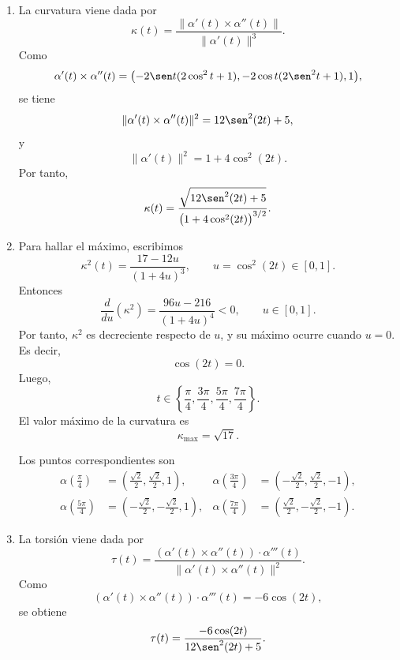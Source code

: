 \documentclass[11pt,respuestas,a4]{aleph-examen}
\begin{document}
\begin{preguntas}
\begin{respuesta}
\begin{enumerate}
    \item La curvatura viene dada por
    \[
        \kappa(t)
        =
        \frac{\|\alpha'(t)\times\alpha''(t)\|}{\|\alpha'(t)\|^3}.
    \]
    Como
    \[
        \alpha'(t)\times\alpha''(t)
        =
        \bigl(
            -2\sen t(2\cos^2t+1),
            -2\cos t(2\sen^2t+1),
            1
        \bigr),
    \]
    se tiene
    \[
        \|\alpha'(t)\times\alpha''(t)\|^2
        =
        12\sen^2(2t)+5,
    \]
    y
    \[
        \|\alpha'(t)\|^2
        =
        1+4\cos^2(2t).
    \]
    Por tanto,
    \[
        \kappa(t)
        =
        \frac{\sqrt{12\sen^2(2t)+5}}
        {\bigl(1+4\cos^2(2t)\bigr)^{3/2}}.
    \]

    \item Para hallar el máximo, escribimos
    \[
        \kappa^2(t)
        =
        \frac{17-12u}{(1+4u)^3},
        \qquad
        u=\cos^2(2t)\in[0,1].
    \]
    Entonces
    \[
        \frac{d}{du}\left(\kappa^2\right)
        =
        \frac{96u-216}{(1+4u)^4}<0,
        \qquad u\in[0,1].
    \]
    Por tanto, \(\kappa^2\) es decreciente respecto de \(u\), y su máximo ocurre cuando \(u=0\). Es decir,
    \[
        \cos(2t)=0.
    \]
    Luego,
    \[
        t\in
        \left\{
            \frac{\pi}{4},
            \frac{3\pi}{4},
            \frac{5\pi}{4},
            \frac{7\pi}{4}
        \right\}.
    \]
    El valor máximo de la curvatura es
    \[
        \kappa_{\max}=\sqrt{17}.
    \]

    Los puntos correspondientes son
    \begin{align*}
        \alpha\left(\frac{\pi}{4}\right)
        &=
        \left(
            \frac{\sqrt{2}}{2},
            \frac{\sqrt{2}}{2},
            1
        \right),
        &
        \alpha\left(\frac{3\pi}{4}\right)
        &=
        \left(
            -\frac{\sqrt{2}}{2},
            \frac{\sqrt{2}}{2},
            -1
        \right),
        \\
        \alpha\left(\frac{5\pi}{4}\right)
        &=
        \left(
            -\frac{\sqrt{2}}{2},
            -\frac{\sqrt{2}}{2},
            1
        \right),
        &
        \alpha\left(\frac{7\pi}{4}\right)
        &=
        \left(
            \frac{\sqrt{2}}{2},
            -\frac{\sqrt{2}}{2},
            -1
        \right).
    \end{align*}

    \item La torsión viene dada por
    \[
        \tau(t)
        =
        \frac{(\alpha'(t)\times\alpha''(t))\cdot\alpha'''(t)}
        {\|\alpha'(t)\times\alpha''(t)\|^2}.
    \]
    Como
    \[
        (\alpha'(t)\times\alpha''(t))\cdot\alpha'''(t)
        =
        -6\cos(2t),
    \]
    se obtiene
    \[
        \tau(t)
        =
        \frac{-6\cos(2t)}{12\sen^2(2t)+5}.
    \]
\end{enumerate}
\end{respuesta}

\end{preguntas}
\end{document}
